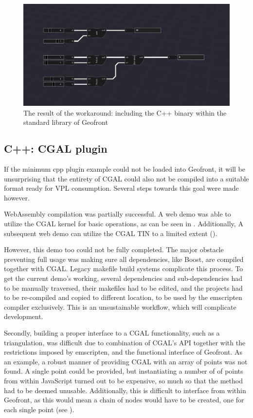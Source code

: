 \begin{figure}
  \graphicspath{{../../assets/images/6.1.3/}}
  \centering
  \includegraphics[width=0.50\linewidth]{graph.PNG}
  \caption[loading a plugin]{The result of the workaround: including the C++ binary within the standard library of Geofront}
  \label{fig:min-cpp:workaround}
\end{figure}

\subsection{C++: CGAL plugin}

If the minimum cpp plugin example could not be loaded into Geofront, it will be unsurprising that the entirety of CGAL could also not be compiled into a suitable format ready for VPL consumption.
Several steps towards this goal were made however.

WebAssembly compilation was partially successful.
A web demo was able to utilize the CGAL kernel for basic operations, as can be seen in . 
Additionally, A subsequent web demo can utilize the CGAL TIN to a limited extent ().

However, this demo too could not be fully completed. The major obstacle preventing full usage was making sure all dependencies, like Boost, are compiled together with CGAL.
Legacy makefile build systems complicate this process. 
To get the current demo's working, several dependencies and sub-dependencies had to be manually traversed, their makefiles had to be edited, and the projects had to be re-compiled and copied to different location, to be used by the emscripten compiler exclusively. 
This is an unsustainable workflow, which will complicate development.  

Secondly, building a proper interface to a CGAL functionality, such as a triangulation, was difficult due to combination of CGAL's API together with the restrictions imposed by emscripten, and the functional interface of Geofront. 
As an example, a robust manner of providing CGAL with an array of points was not found.
A single point could be provided, but instantiating a number of of points from within JavaScript turned out to be expensive, so much so that the method had to be deemed unusable. 
Additionally, this is difficult to interface from within Geofront, as this would mean a chain of nodes would have to be created, one for each single point (see ). 

